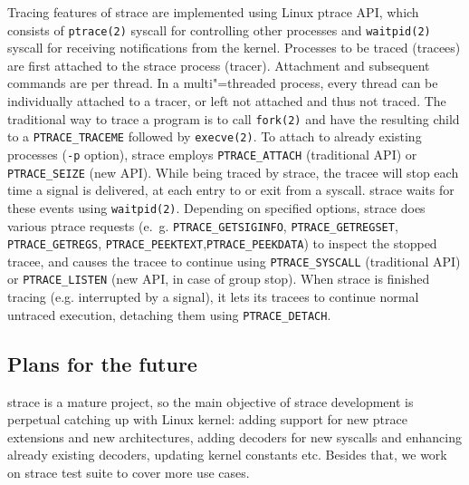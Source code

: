 \documentclass[10pt, a5paper]{article}
\def\v!#1!{\texttt{#1}}
\begin{document}
Tracing features of strace are implemented using Linux ptrace API, which consists of \v!ptrace(2)! syscall for controlling other processes and \v!waitpid(2)! syscall for receiving notifications from the kernel.  Processes to be traced (tracees) are first attached to the strace process (tracer).  Attachment and subsequent commands are per thread.  In a multi"=threaded process, every thread can be individually attached to a tracer, or left not attached and thus not traced.  The traditional way to trace a program is to call \v!fork(2)! and have the resulting child to a \v!PTRACE\_TRACEME! followed by \v!execve(2)!.  To attach to  already existing processes (\v!-p! option), strace employs \v!PTRACE\_ATTACH! (traditional API) or \v!PTRACE\_SEIZE! (new API).  While being traced by strace, the tracee will stop each time a signal is delivered, at each entry to or exit  from a syscall.  strace waits for these events using \v!waitpid(2)!.  Depending on specified options, strace does various ptrace requests (e.~g. \v!PTRACE\_GET\-SIGINFO!, \v!PTRACE\_GETREGSET!, \v!PTRACE\_GETREGS!, \v!PTRACE\_PEEKTEXT!,\linebreak \v!PTRACE\_PEEKDATA!) to inspect the stopped tracee, and causes the tracee to continue using \v!PTRACE\_SYSCALL!  (traditional API) or \v!PTRACE\_LISTEN! (new API, in case of group stop).  When strace is finished tracing (e.g. interrupted by a signal), it lets its tracees to continue normal untraced execution, detaching them using \v!PTRACE\_DETACH!.

\subsection*{Plans for the future}

strace is a mature project, so the main objective of strace development is perpetual catching up with Linux kernel: adding support for new ptrace extensions and new architectures, adding decoders for new syscalls and enhancing already existing decoders, updating kernel constants etc.  Besides that, we work on strace test suite to cover more use cases.
\end{document}
